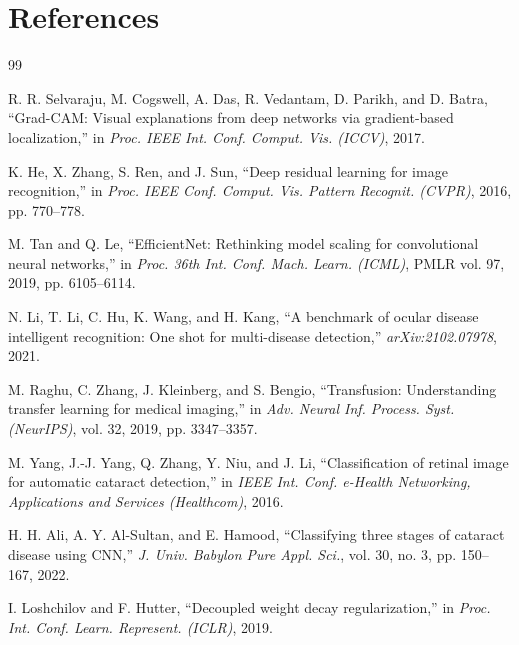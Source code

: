 \documentclass[12pt, a4paper]{article}
\begin{document}
\section*{References}

\begin{thebibliography}{99}

R. R. Selvaraju, M. Cogswell, A. Das, R. Vedantam, D. Parikh, and D. Batra, ``Grad-CAM: Visual explanations from deep networks via gradient-based localization,'' in \textit{Proc. IEEE Int. Conf. Comput. Vis. (ICCV)}, 2017.

K. He, X. Zhang, S. Ren, and J. Sun, ``Deep residual learning for image recognition,'' in \textit{Proc. IEEE Conf. Comput. Vis. Pattern Recognit. (CVPR)}, 2016, pp. 770--778.

M. Tan and Q. Le, ``EfficientNet: Rethinking model scaling for convolutional neural networks,'' in \textit{Proc. 36th Int. Conf. Mach. Learn. (ICML)}, PMLR vol. 97, 2019, pp. 6105--6114.

N. Li, T. Li, C. Hu, K. Wang, and H. Kang, ``A benchmark of ocular disease intelligent recognition: One shot for multi-disease detection,'' \textit{arXiv:2102.07978}, 2021.

M. Raghu, C. Zhang, J. Kleinberg, and S. Bengio, ``Transfusion: Understanding transfer learning for medical imaging,'' in \textit{Adv. Neural Inf. Process. Syst. (NeurIPS)}, vol. 32, 2019, pp. 3347--3357.

M. Yang, J.-J. Yang, Q. Zhang, Y. Niu, and J. Li, ``Classification of retinal image for automatic cataract detection,'' in \textit{IEEE Int. Conf. e-Health Networking, Applications and Services (Healthcom)}, 2016.

H. H. Ali, A. Y. Al-Sultan, and E. Hamood, ``Classifying three stages of cataract disease using CNN,'' \textit{J. Univ. Babylon Pure Appl. Sci.}, vol. 30, no. 3, pp. 150--167, 2022.

I. Loshchilov and F. Hutter, ``Decoupled weight decay regularization,'' in \textit{Proc. Int. Conf. Learn. Represent. (ICLR)}, 2019.

\end{thebibliography}
\end{document}
